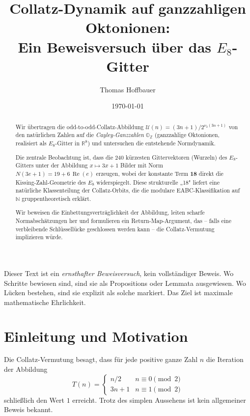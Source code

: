 \documentclass[12pt,a4paper]{article}
\title{%
  Collatz-Dynamik auf ganzzahligen Oktonionen:\\[0.3em]
  \large Ein Beweisversuch über das $E_8$-Gitter%
}
\author{Thomas Hoffbauer}
\date{\today}
\newcommand{\vii}{\nu_2}           %
\newcommand{\U}{\mathcal{U}}       %
\newcommand{\OZ}{\mathbb{O}_{\mathbb{Z}}}  %
\newcommand{\Norm}[1]{N(#1)}       %
\renewcommand{\Re}{\operatorname{Re}}
\newcommand{\N}{\mathbb{N}}
\newcommand{\R}{\mathbb{R}}
\begin{document}
\maketitle

\begin{abstract}
Wir übertragen die odd-to-odd-Collatz-Abbildung $\U(n) = (3n+1)/2^{\vii(3n+1)}$
von den natürlichen Zahlen auf die \emph{Cayley-Ganzzahlen} $\OZ$
(ganzzahlige Oktonionen, realisiert als $E_8$-Gitter in $\R^8$)
und untersuchen die entstehende Normdynamik.

Die zentrale Beobachtung ist, dass die 240 kürzesten Gittervektoren (Wurzeln)
des $E_8$-Gitters unter der Abbildung $x \mapsto 3x+1$ Bilder mit Norm
$\Norm{3e+1} = 19 + 6\,\Re(e)$ erzeugen, wobei der konstante Term \textbf{18}
direkt die Kissing-Zahl-Geometrie des $E_8$ widerspiegelt.
Diese strukturelle „18" liefert eine natürliche Klassenteilung der
Collatz-Orbits, die die modulare EABC-Klassifikation auf $\N$
gruppentheoretisch erklärt.

Wir beweisen die Einbettungsverträglichkeit der Abbildung,
leiten scharfe Normabschätzungen her und formulieren ein
Return-Map-Argument, das – falls eine verbleibende Schlüssellücke
geschlossen werden kann – die Collatz-Vermutung implizieren würde.
\end{abstract}

\tableofcontents

\bigskip
\begin{tcolorbox}[warnung, title={Zur Einordnung dieses Dokuments}]
Dieser Text ist ein \emph{ernsthafter Beweisversuch}, kein vollständiger Beweis.
Wo Schritte bewiesen sind, sind sie als Propositions oder Lemmata ausgewiesen.
Wo Lücken bestehen, sind sie explizit als solche markiert.
Das Ziel ist maximale mathematische Ehrlichkeit.
\end{tcolorbox}

\section{Einleitung und Motivation}

Die Collatz-Vermutung besagt, dass für jede positive ganze Zahl $n$
die Iteration der Abbildung
\[
  T(n) = \begin{cases} n/2 & n \equiv 0 \pmod 2 \\ 3n+1 & n \equiv 1 \pmod 2 \end{cases}
\]
schließlich den Wert $1$ erreicht. Trotz des simplen Aussehens ist kein
allgemeiner Beweis bekannt.
\end{document}
